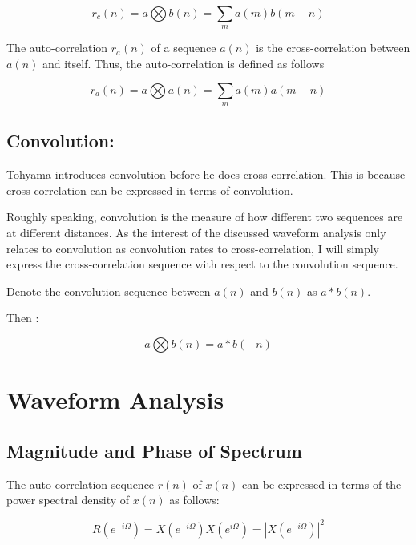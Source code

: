 \documentclass[12pt]{article}
\begin{document}
\begin{equation}
r_c(n)= a \bigotimes b(n) = \sum\limits_{m} a(m)b(m-n)\label{eq:cross-correlation}
\end{equation}

The auto-correlation $r_a(n)$ of a sequence $a(n)$ is the cross-correlation between $a(n)$ and itself. Thus, the auto-correlation is defined as follows\citep{aa}

\begin{equation}
r_a(n) = a \bigotimes a(n) = \sum\limits_{m} a(m)a(m-n)\label{eq:auto-correlation}
\end{equation}

\subsection{Convolution:}

Tohyama introduces convolution before he does cross-correlation. This is because cross-correlation can be expressed in terms of convolution.\citep{aa}\newline

Roughly speaking, convolution is the measure of how different two sequences are at different distances. As the interest of the discussed waveform analysis only relates to convolution as convolution rates to cross-correlation, I will simply express the cross-correlation sequence with respect to the convolution sequence.

Denote the convolution sequence between $a(n)$ and $b(n)$ as $a*b(n)$.

Then \citep{aa}:

\begin{equation}
a \bigotimes b(n) = a * b(-n)\label{eq:convolution}
\end{equation}

\section{Waveform Analysis}

\subsection{Magnitude and Phase of Spectrum}

The auto-correlation sequence $r(n)$ of $x(n)$ can be expressed in terms of the power spectral density of $x(n)$ as follows\citep{aa}:

\begin{equation}
R(e^{-i\Omega}) = X(e^{-i\Omega})X(e^{i\Omega}) = |X(e^{-i\Omega})|^2
\label{autocorrelation power spectrum}
\end{equation}
\end{document}
